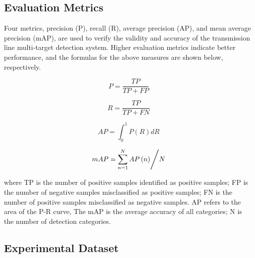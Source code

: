 \documentclass[sn-mathphys,Numbered]{sn-jnl}%
\theoremstyle{thmstyleone}%
\theoremstyle{thmstyletwo}%
\theoremstyle{thmstylethree}%
\begin{document}
\subsection{Evaluation Metrics}

Four metrics, precision (P), recall (R), average precision (AP), and mean average precision (mAP), are used to verify the validity and accuracy of the transmission line multi-target detection system. Higher evaluation metrics indicate better performance, and the formulas for the above measures are shown below, respectively. 

\begin{equation}
P = \frac{{TP}}{{TP + FP}}
\end{equation}

\begin{equation}
R = \frac{{TP}}{{TP + FN}}
\end{equation}

\begin{equation}
AP = \int_0^1 {P\left( R \right)} dR
\end{equation}

\begin{equation}
 { {mAP =\sum\limits_ {n = 1}^N {AP\left(n\right)}}\mathord {\left/
 {\vphantom { {mAP =\sum\limits_ {n = 1}^N {AP\left(n\right)}}N}}\right.
\kern-\nulldelimiterspace}N}
\end{equation}

where TP is the number of positive samples identified as positive samples; FP is the number of negative samples misclassified as positive samples; FN is the number of positive samples misclassified as negative samples. AP refers to the area of the P-R curve, The mAP is the average accuracy of all categories; N is the number of detection categories. 

\subsection {Experimental Dataset}
\end{document}
